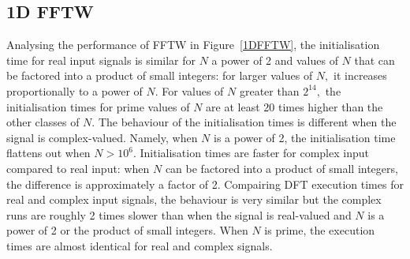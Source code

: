 \documentclass[12pt, a4paper]{article} \setlength{\textheight}{24cm}
\begin{document}
\subsection{1D FFTW}
Analysing the performance of FFTW in Figure~\ref{1DFFTW}, the
initialisation time for real input signals is similar for $N$ a power
of 2 and values of $N$ that can be factored into a product of small
integers: for larger values of $N,$ it increases proportionally to a
power of $N.$ For values of $N$ greater than $2^{14},$ the
initialisation times for prime values of $N$ are at least 20 times
higher than the other classes of $N.$ The behaviour of the
initialisation times is different when the signal is complex-valued.
Namely, when $N$ is a power of 2, the initialisation time flattens out
when $N>10^6.$ Initialisation times are faster for complex input
compared to real input: when $N$ can be factored into a product of
small integers, the difference is approximately a factor of 2.
Compairing DFT execution times for real and complex input signals, the
behaviour is very similar but the complex runs are roughly 2 times
slower than when the signal is real-valued and $N$ is a power of 2 or
the product of small integers. When $N$ is prime, the execution times
are almost identical for real and complex signals.
\end{document}
